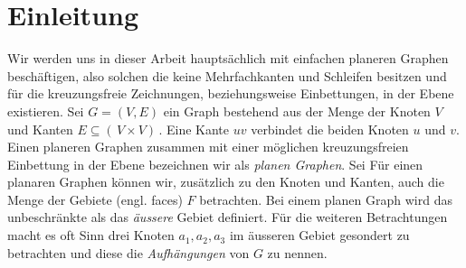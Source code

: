 \chapter{Einleitung}\label{intro}

Wir werden uns in dieser Arbeit hauptsächlich mit einfachen planeren Graphen beschäftigen, also solchen die keine Mehrfachkanten und Schleifen besitzen und für die kreuzungsfreie Zeichnungen, beziehungsweise Einbettungen, in der Ebene existieren. Sei $G = (V,E)$ ein Graph bestehend aus der Menge der Knoten $V$ und Kanten $E \subseteq ( \,V \times V ) \,$. Eine Kante $uv$ verbindet die beiden Knoten $u$ und $v$. Einen planeren Graphen zusammen mit einer möglichen kreuzungsfreien Einbettung in der Ebene bezeichnen wir als \textit{planen Graphen}. Sei Für einen planaren Graphen können wir, zusätzlich zu den Knoten und Kanten, auch die Menge der Gebiete (engl. faces) $F$ betrachten. Bei einem planen Graph wird das unbeschränkte als das \textit{äussere} Gebiet definiert. Für die weiteren Betrachtungen macht es oft Sinn drei Knoten $a_1,a_2,a_3$ im äusseren Gebiet gesondert zu betrachten und diese die \textit{Aufhängungen} von $G$ zu nennen.\\

